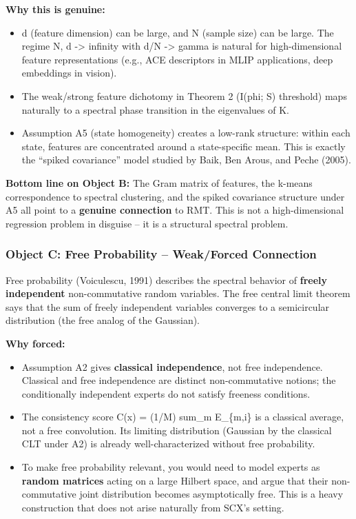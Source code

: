 \documentclass[
  12pt,
]{article}
\providecommand{\tightlist}{%
  \setlength{\itemsep}{0pt}\setlength{\parskip}{0pt}}
\begin{document}
\textbf{Why this is genuine:}

\begin{itemize}
\tightlist
\item
  d (feature dimension) can be large, and N (sample size) can be large.
  The regime N, d -\textgreater{} infinity with d/N -\textgreater{}
  gamma is natural for high-dimensional feature representations (e.g.,
  ACE descriptors in MLIP applications, deep embeddings in vision).
\item
  The weak/strong feature dichotomy in Theorem 2 (I(phi; S) threshold)
  maps naturally to a spectral phase transition in the eigenvalues of K.
\item
  Assumption A5 (state homogeneity) creates a low-rank structure: within
  each state, features are concentrated around a state-specific mean.
  This is exactly the ``spiked covariance'' model studied by Baik, Ben
  Arous, and Peche (2005).
\end{itemize}

\textbf{Bottom line on Object B:} The Gram matrix of features, the
k-means correspondence to spectral clustering, and the spiked covariance
structure under A5 all point to a \textbf{genuine connection} to RMT.
This is not a high-dimensional regression problem in disguise -- it is a
structural spectral problem.

\subsubsection{Object C: Free Probability -- Weak/Forced
Connection}\label{object-c-free-probability-weakforced-connection}

Free probability (Voiculescu, 1991) describes the spectral behavior of
\textbf{freely independent} non-commutative random variables. The free
central limit theorem says that the sum of freely independent variables
converges to a semicircular distribution (the free analog of the
Gaussian).

\textbf{Why forced:}

\begin{itemize}
\tightlist
\item
  Assumption A2 gives \textbf{classical independence}, not free
  independence. Classical and free independence are distinct
  non-commutative notions; the conditionally independent experts do not
  satisfy freeness conditions.
\item
  The consistency score C(x) = (1/M) sum\_m E\_\{m,i\} is a classical
  average, not a free convolution. Its limiting distribution (Gaussian
  by the classical CLT under A2) is already well-characterized without
  free probability.
\item
  To make free probability relevant, you would need to model experts as
  \textbf{random matrices} acting on a large Hilbert space, and argue
  that their non-commutative joint distribution becomes asymptotically
  free. This is a heavy construction that does not arise naturally from
  SCX's setting.
\end{itemize}
\end{document}
